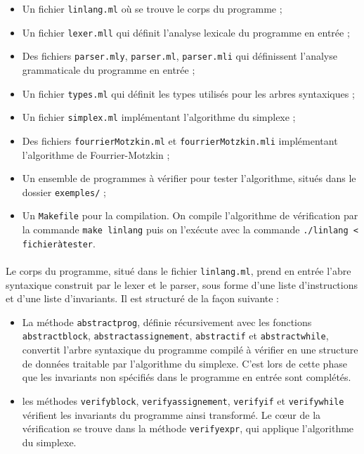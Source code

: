 \documentclass[a4paper]{article}
\begin{document}
\begin{itemize}
  \item Un fichier \texttt{linlang.ml} où se trouve le corps du programme ;
  \item Un fichier \texttt{lexer.mll} qui définit l'analyse lexicale du programme en entrée ;
  \item Des fichiers \texttt{parser.mly}, \texttt{parser.ml}, \texttt{parser.mli} qui définissent l'analyse grammaticale du programme en entrée ;
  \item Un fichier \texttt{types.ml} qui définit les types utilisés pour les arbres syntaxiques ;
  \item Un fichier \texttt{simplex.ml} implémentant l'algorithme du simplexe ;
  \item Des fichiers \texttt{fourrierMotzkin.ml} et \texttt{fourrierMotzkin.mli} implémentant l'algorithme de Fourrier-Motzkin ;
  \item Un ensemble de programmes à vérifier pour tester l'algorithme, situés dans le dossier \texttt{exemples/} ;
  \item Un \texttt{Makefile} pour la compilation. On compile l'algorithme de vérification par la commande \texttt{make linlang} puis on l'exécute avec la commande \texttt{./linlang < fichier\textunderscore à\textunderscore tester}.

\end{itemize}

\paragraph{}

Le corps du programme, situé dans le fichier \texttt{linlang.ml}, prend en entrée l'abre syntaxique construit par le lexer et le parser, sous forme d'une liste d'instructions et d'une liste d'invariants. Il est structuré de la façon suivante :

\begin{itemize}
  \item La méthode \texttt{abstract\textunderscore prog}, définie récursivement avec les fonctions \texttt{abstract\textunderscore block}, \texttt{abstract\textunderscore assignement}, \texttt{abstract\textunderscore if} et \texttt{abstract\textunderscore while}, convertit l'arbre syntaxique du programme compilé à vérifier en une structure de données traitable par l'algorithme du simplexe. C'est lors de cette phase que les invariants non spécifiés dans le programme en entrée sont complétés.
  \item les méthodes \texttt{verify\textunderscore block}, \texttt{verify\textunderscore assignement}, \texttt{verify\textunderscore if} et \texttt{verify\textunderscore while} vérifient les invariants du programme ainsi transformé. Le c\oe{}ur de la vérification se trouve dans la méthode \texttt{verify\textunderscore expr}, qui applique l'algorithme du simplexe.
\end{itemize}
\end{document}
